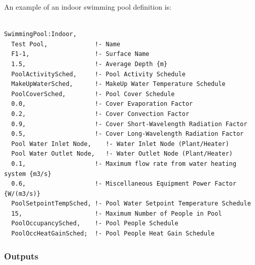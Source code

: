 An example of an indoor swimming pool definition is:

\begin{lstlisting}

SwimmingPool:Indoor,
  Test Pool,             !- Name
  F1-1,                  !- Surface Name
  1.5,                   !- Average Depth {m}
  PoolActivitySched,     !- Pool Activity Schedule
  MakeUpWaterSched,      !- MakeUp Water Temperature Schedule
  PoolCoverSched,        !- Pool Cover Schedule
  0.0,                   !- Cover Evaporation Factor
  0.2,                   !- Cover Convection Factor
  0.9,                   !- Cover Short-Wavelength Radiation Factor
  0.5,                   !- Cover Long-Wavelength Radiation Factor
  Pool Water Inlet Node,    !- Water Inlet Node (Plant/Heater)
  Pool Water Outlet Node,   !- Water Outlet Node (Plant/Heater)
  0.1,                   !- Maximum flow rate from water heating system {m3/s}
  0.6,                   !- Miscellaneous Equipment Power Factor {W/(m3/s)}
  PoolSetpointTempSched, !- Pool Water Setpoint Temperature Schedule
  15,                    !- Maximum Number of People in Pool
  PoolOccupancySched,    !- Pool People Schedule
  PoolOccHeatGainSched;  !- Pool People Heat Gain Schedule
\end{lstlisting}

\subsubsection{Outputs}\label{outputs-4-007}

